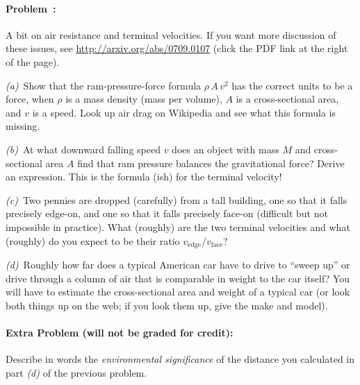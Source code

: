 \documentclass[12pt]{article}
\begin{document}
\paragraph{Problem~\theproblem:}%
A bit on air resistance and terminal velocities. If you want more
discussion of these issues, see \url{http://arxiv.org/abs/0709.0107}
(click the PDF link at the right of the page).

\textsl{(a)}~Show that the ram-pressure-force formula $\rho\,A\,v^2$ has the
correct units to be a force, when $\rho$ is a mass density (mass per volume),
$A$ is a cross-sectional area, and $v$ is a speed. Look up air drag on
Wikipedia and see what this formula is missing.

\textsl{(b)}~At what downward falling speed $v$ does an object with
mass $M$ and cross-sectional area $A$ find that ram pressure balances
the gravitational force? Derive an expression. This is the formula
(ish) for the terminal velocity!

\textsl{(c)}~Two pennies are dropped (carefully) from a tall building,
one so that it falls precisely edge-on, and one so that it falls
precisely face-on (difficult but not impossible in practice).  What
(roughly) are the two terminal velocities and what (roughly) do you expect to be
their ratio $v_{\mathrm{edge}}/v_{\mathrm{face}}$?

\textsl{(d)}~Roughly how far does a typical American car have to drive
to ``sweep up'' or drive through a column of air that is comparable in
weight to the car itself?  You will have to estimate the
cross-sectional area and weight of a typical car (or look both things
up on the web; if you look them up, give the make and model).

\paragraph{Extra Problem (will not be graded for credit):}%
Describe in words the \emph{environmental significance} of the
distance you calculated in part \textsl{(d)} of the previous problem.
\end{document}
